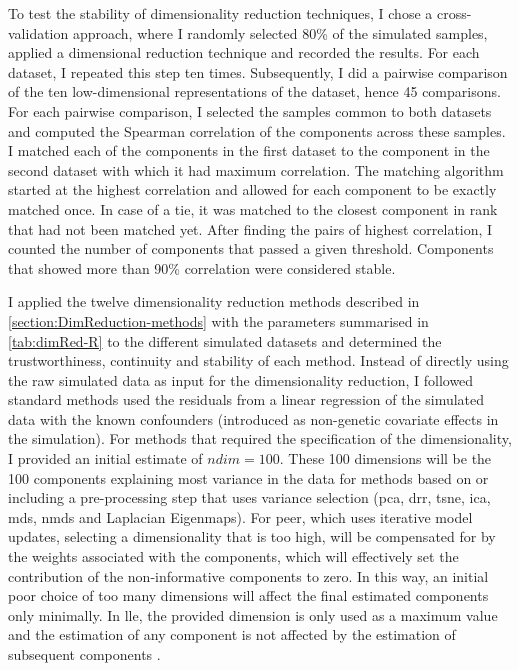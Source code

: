 To test the stability of dimensionality reduction techniques, I chose a cross-validation approach, where I randomly selected \num{80}\% of the simulated samples, applied a dimensional reduction technique and recorded the results. For each dataset, I repeated this step ten times. Subsequently, I did a pairwise comparison of the ten low-dimensional representations of the dataset, hence \num{45} comparisons. For each pairwise comparison, I selected the samples common to both datasets and computed the Spearman correlation of the components across these samples. I matched each of the components in the first dataset to the component in the second dataset with which it had maximum correlation. The matching algorithm started at the highest correlation and allowed for each component to be exactly matched once. In case of a tie, it was matched to the closest component in rank that had not been matched yet. After finding the pairs of highest correlation, I counted the number of components that passed a given threshold. Components that showed more than \num{90}\% correlation were considered stable. 

I applied the twelve dimensionality reduction methods described in \cref{section:DimReduction-methods} with the parameters summarised in \cref{tab:dimRed-R} to the different simulated datasets and determined the trustworthiness, continuity and stability of each method.  Instead of directly using the raw simulated data as input for the dimensionality reduction, I followed standard methods used the residuals from a linear regression of the simulated data with the known confounders (introduced as non-genetic covariate effects in the simulation).  For methods that required the specification of the dimensionality, I provided an initial estimate of \(ndim=100\).  These \num{100} dimensions will be the \num{100} components explaining most variance in the data for methods based on or including a pre-processing step that uses variance selection (\gls{pca}, \gls{drr}, \gls{tsne}, \gls{ica}, \gls{mds}, \gls{nmds} and Laplacian Eigenmaps). For \gls{peer}, which uses iterative model updates, selecting a dimensionality that is too high, will be compensated for by the weights associated with the components, which will effectively set the contribution of the non-informative components to  zero. In this way, an initial poor choice of too many dimensions will affect the final estimated components only minimally. In \gls{lle}, the provided dimension is only used as a maximum value and the estimation of any component is not affected by the estimation of subsequent components \citep{Roweis2000,Kayo2006}.

